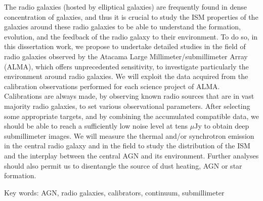 The radio galaxies (hosted by elliptical galaxies) are frequently found in dense concentration of galaxies, and thus it is crucial to study the ISM properties of the galaxies around these radio galaxies to be able to understand the formation, evolution, and the feedback of the radio galaxy to their environment. To do so, in this dissertation work, we propose to undertake detailed studies in the field of radio galaxies observed by the Atacama Large Millimeter/submillimeter Array (ALMA), which offers unprecedented sensitivity, to investigate particularly the environment around radio galaxies. We will exploit the data acquired from the calibration observations performed for each science project of ALMA. Calibrations are always made, by observing known radio sources that are in vast majority radio galaxies, to set various observational parameters. After selecting some appropriate targets, and by combining the accumulated compatible data, we should be able to reach a sufficiently low noise level at tens $\mu$Jy to obtain deep submillimeter images. We will measure the thermal and/or synchrotron emission in the central radio galaxy and in the field to study the distribution of the ISM and the interplay between the central AGN and its environment. Further analyses should also permit us to disentangle the source of dust heating, AGN or star formation.

\vspace{1.0cm}

\noindent Key words: AGN, radio galaxies, calibrators, continuum, submillimeter



